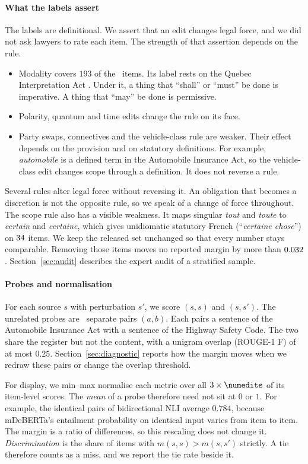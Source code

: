 \documentclass{BVP_JCLLT}
\begin{document}
{\paragraph{What the labels assert}
The labels are definitional. We assert that an edit changes legal force, and we
did not ask lawyers to rate each item. The strength of that assertion depends on
the rule.

\begin{itemize}\itemsep1pt
\item Modality covers $193$ of the \numedits\ items. Its label rests on the
  Quebec Interpretation Act \cite{interpretationact}. Under it, a thing that
  ``shall'' or ``must'' be done is imperative. A thing that ``may'' be done is
  permissive.
\item Polarity, quantum and time edits change the rule on its face.
\item Party swaps, connectives and the vehicle-class rule are weaker. Their
  effect depends on the provision and on statutory definitions. For example,
  \emph{automobile} is a defined term in the Automobile Insurance Act, so the
  vehicle-class edit changes scope through a definition. It does not reverse a
  rule.
\end{itemize}

Several rules alter legal force without reversing it. An obligation that becomes
a discretion is not the opposite rule, so we speak of a change of force
throughout. The scope rule also has a visible weakness. It maps singular
\emph{tout} and \emph{toute} to \emph{certain} and \emph{certaine}, which gives
unidiomatic statutory French (``\emph{certaine chose}'') on $34$ items.
We keep the released set unchanged so that every number stays comparable.
Removing those items moves no reported margin by more than $0.032$.
Section~\ref{sec:audit} describes the expert audit of a stratified sample.

\paragraph{Probes and normalisation}
For each source $s$ with perturbation $s'$, we score $(s,s)$ and $(s,s')$. The
unrelated probes are \numedits\ separate pairs $(a,b)$. Each pairs a sentence of
the Automobile Insurance Act with a sentence of the Highway Safety Code. The two
share the register but not the content, with a unigram overlap (ROUGE-1 F) of at
most $0.25$. Section~\ref{sec:diagnostic} reports how the margin moves when we
redraw these pairs or change the overlap threshold.

For display, we min--max normalise each metric over all $3\times\numedits$ of
its item-level scores. The \emph{mean} of a probe therefore need not sit at $0$
or $1$. For example, the identical pairs of bidirectional NLI average $0.784$,
because mDeBERTa's entailment probability on identical input varies from item to
item. The margin is a ratio of differences, so this rescaling does not change it.
\emph{Discrimination} is the share of items with $m(s,s) > m(s,s')$ strictly. A
tie therefore counts as a miss, and we report the tie rate beside it.}
\end{document}
